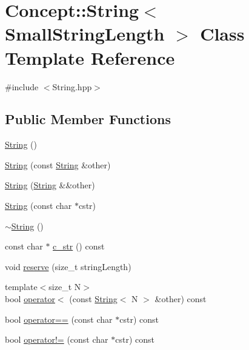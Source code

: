\hypertarget{class_concept_1_1_string}{}\section{Concept\+::String$<$ Small\+String\+Length $>$ Class Template Reference}
\label{class_concept_1_1_string}


{\ttfamily \#include $<$String.\+hpp$>$}

\subsection*{Public Member Functions}
\begin{DoxyCompactItemize}
\item 
\mbox{\hyperlink{class_concept_1_1_string_a65640f64bade4d9d3295adfadaee897c}{String}} ()
\item 
\mbox{\hyperlink{class_concept_1_1_string_a32c7cfe0b5f891be497b6a5755709239}{String}} (const \mbox{\hyperlink{class_concept_1_1_string}{String}} \&other)
\item 
\mbox{\hyperlink{class_concept_1_1_string_ada72510f0b4c9cbfa620c4a983f4ff35}{String}} (\mbox{\hyperlink{class_concept_1_1_string}{String}} \&\&other)
\item 
\mbox{\hyperlink{class_concept_1_1_string_ac70882c17fa46cac52a0bb5fad34962c}{String}} (const char $\ast$cstr)
\item 
\mbox{\hyperlink{class_concept_1_1_string_a4ad5e8d6735b8990ef70997068661056}{$\sim$\+String}} ()
\item 
const char $\ast$ \mbox{\hyperlink{class_concept_1_1_string_ae7fb4fa9bc119158939fea1ff0496e02}{c\+\_\+str}} () const
\item 
void \mbox{\hyperlink{class_concept_1_1_string_a6b828c71bd29fbc4f965f4abde5eeb4f}{reserve}} (size\+\_\+t string\+Length)
\item 
{\footnotesize template$<$size\+\_\+t N$>$ }\\bool \mbox{\hyperlink{class_concept_1_1_string_a3289dc92f822852100885569f6a7bab9}{operator$<$}} (const \mbox{\hyperlink{class_concept_1_1_string}{String}}$<$ N $>$ \&other) const
\item 
bool \mbox{\hyperlink{class_concept_1_1_string_a93eecf5bf6eeab17e773126bc83bc63a}{operator==}} (const char $\ast$cstr) const
\item 
bool \mbox{\hyperlink{class_concept_1_1_string_ab1fa781b5e29a1e7c2af7523be876515}{operator!=}} (const char $\ast$cstr) const

\end{DoxyCompactItemize}
